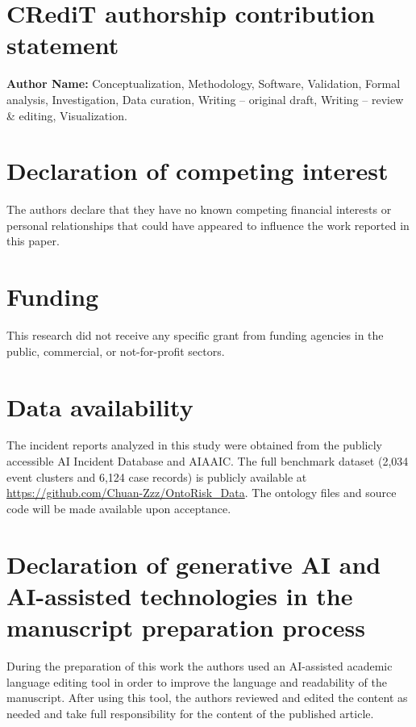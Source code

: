 \documentclass[a4paper,fleqn]{cas-dc}
\begin{document}
\section*{CRediT authorship contribution statement}
\textbf{Author Name:} Conceptualization, Methodology, Software,
Validation, Formal analysis, Investigation, Data curation,
Writing -- original draft, Writing -- review \& editing,
Visualization.

\section*{Declaration of competing interest}
The authors declare that they have no known competing financial
interests or personal relationships that could have appeared to
influence the work reported in this paper.

\section*{Funding}
This research did not receive any specific grant from funding
agencies in the public, commercial, or not-for-profit sectors.

\section*{Data availability}
The incident reports analyzed in this study were obtained from the
publicly accessible AI Incident Database and AIAAIC. The full
benchmark dataset (2{,}034 event clusters and 6{,}124 case records)
is publicly available at
\url{https://github.com/Chuan-Zzz/OntoRisk_Data}. The ontology files
and source code will be made available upon acceptance.

\section*{Declaration of generative AI and AI-assisted technologies
in the manuscript preparation process}
During the preparation of this work the authors used an AI-assisted
academic language editing tool in order to improve the language and
readability of the manuscript. After using this tool, the authors
reviewed and edited the content as needed and take full
responsibility for the content of the published article.


\end{document}
